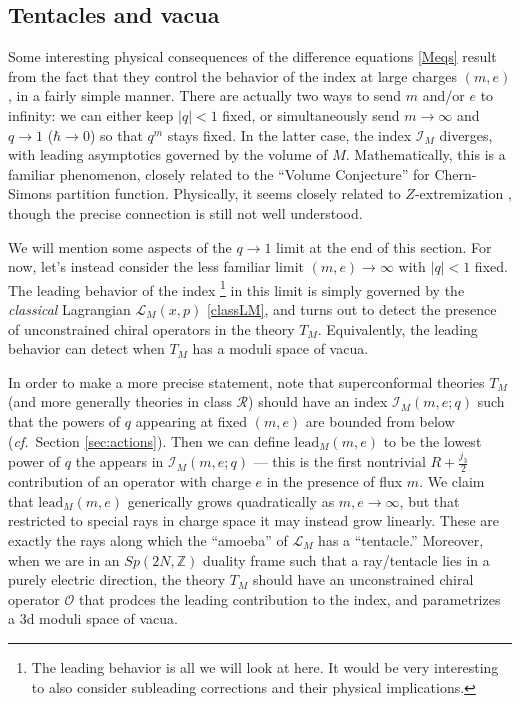 \documentclass[11pt,letterpaper]{article}
\numberwithin{equation}{section}
\newcommand{\lead}{\mathrm{lead}}
\newcommand{\cf}{\emph{cf.}}
\newcommand{\Z}{{\mathbb Z}}
\newcommand{\CI}{\mathcal{I}}
\newcommand{\CL}{\mathcal{L}}
\newcommand{\CO}{\mathcal{O}}
\newcommand{\CR}{\mathcal{R}}
\begin{document}
\subsection{Tentacles and vacua}
\label{sec:tent}


Some interesting physical consequences of the difference equations \eqref{Meqs} result from the fact that they control the behavior of the index at large charges $(m,e)$, in a fairly simple manner. There are actually two ways to send $m$ and/or $e$ to infinity: we can either keep $|q|<1$ fixed, or simultaneously send $m\to \infty$ and $q\to 1$ ($\hbar\to 0$) so that $q^m$ stays fixed. In the latter case, the index $\CI_M$ diverges, with leading asymptotics governed by the volume of $M$. Mathematically, this is a familiar phenomenon, closely related to the ``Volume Conjecture'' for Chern-Simons partition function. Physically, it seems closely related to $Z$-extremization \cite{Jafferis-Zmin}, though the precise connection is still not well understood.

We will mention some aspects of the $q\to 1$ limit at the end of this section. For now, let's instead consider the less familiar limit $(m,e)\to \infty$ with $|q|<1$ fixed. The leading behavior of the index%
%
\footnote{The leading behavior is all we will look at here. It would be very interesting to also consider subleading corrections and their physical implications.} %
%
in this limit is simply governed by the \emph{classical} Lagrangian $\CL_M(x,p)$ \eqref{classLM}, and turns out to detect the presence of unconstrained chiral operators in the theory $T_M$. Equivalently, the leading behavior can detect when $T_M$ has a moduli space of vacua.




In order to make a more precise statement, note that superconformal theories $T_M$ (and more generally theories in class $\CR$) should have an index $\CI_M(m,e;q)$ such that the powers of $q$ appearing at fixed $(m,e)$ are bounded from below (\cf\ Section \ref{sec:actions}). Then we can define $\lead_M(m,e)$ to be the lowest power of $q$ the appears in $\CI_M(m,e;q)$ --- this is the first nontrivial $R+\tfrac{j_3}{2}$ contribution of an operator with charge $e$ in the presence of flux $m$. We claim that $\lead_M(m,e)$ generically grows quadratically as $m,e\to \infty$, but that restricted to special rays in charge space it may instead grow linearly. These are exactly the rays along which the ``amoeba'' of $\CL_M$ has a ``tentacle.'' Moreover, when we are in an $Sp(2N,\Z)$ duality frame such that a ray/tentacle lies in a purely electric direction, the theory $T_M$ should have an unconstrained chiral operator $\CO$ that prodces the leading contribution to the index, and parametrizes a 3d moduli space of vacua.
\end{document}
